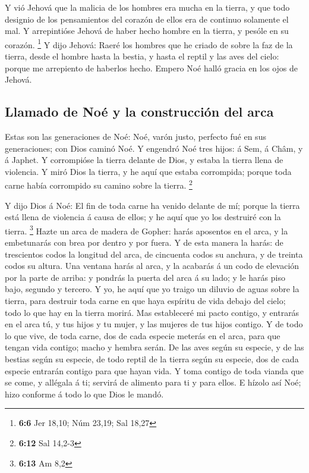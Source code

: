  Y vió Jehová que la malicia de los hombres era mucha en la
tierra, y que todo designio de los pensamientos del corazón de ellos era
de continuo solamente el mal.  Y arrepintióse Jehová de
haber hecho hombre en la tierra, y pesóle en su corazón. \footnote{\textbf{6:6}
  Jer 18,10; Núm 23,19; Sal 18,27}  Y dijo Jehová: Raeré los
hombres que he criado de sobre la faz de la tierra, desde el hombre
hasta la bestia, y hasta el reptil y las aves del cielo: porque me
arrepiento de haberlos hecho.  Empero Noé halló gracia en
los ojos de Jehová.

\hypertarget{llamado-de-nouxe9-y-la-construcciuxf3n-del-arca}{%
\subsection{Llamado de Noé y la construcción del
arca}\label{llamado-de-nouxe9-y-la-construcciuxf3n-del-arca}}

 Estas son las generaciones de Noé: Noé, varón justo,
perfecto fué en sus generaciones; con Dios caminó Noé.  Y
engendró Noé tres hijos: á Sem, á Châm, y á Japhet.  Y
corrompióse la tierra delante de Dios, y estaba la tierra llena de
violencia.  Y miró Dios la tierra, y he aquí que estaba
corrompida; porque toda carne había corrompido su camino sobre la
tierra. \footnote{\textbf{6:12} Sal 14,2-3}

 Y dijo Dios á Noé: El fin de toda carne ha venido delante
de mí; porque la tierra está llena de violencia á causa de ellos; y he
aquí que yo los destruiré con la tierra. \footnote{\textbf{6:13} Am 8,2}
 Hazte un arca de madera de Gopher: harás aposentos en el
arca, y la embetunarás con brea por dentro y por fuera.  Y
de esta manera la harás: de trescientos codos la longitud del arca, de
cincuenta codos su anchura, y de treinta codos su altura. 
Una ventana harás al arca, y la acabarás á un codo de elevación por la
parte de arriba: y pondrás la puerta del arca á su lado; y le harás piso
bajo, segundo y tercero.  Y yo, he aquí que yo traigo un
diluvio de aguas sobre la tierra, para destruir toda carne en que haya
espíritu de vida debajo del cielo; todo lo que hay en la tierra morirá.
 Mas estableceré mi pacto contigo, y entrarás en el arca
tú, y tus hijos y tu mujer, y las mujeres de tus hijos contigo.
 Y de todo lo que vive, de toda carne, dos de cada especie
meterás en el arca, para que tengan vida contigo; macho y hembra serán.
 De las aves según su especie, y de las bestias según su
especie, de todo reptil de la tierra según su especie, dos de cada
especie entrarán contigo para que hayan vida.  Y toma
contigo de toda vianda que se come, y allégala á ti; servirá de alimento
para ti y para ellos.  E hízolo así Noé; hizo conforme á
todo lo que Dios le mandó.

